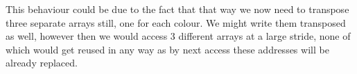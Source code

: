 This behaviour could be due to the fact that that way we now need to transpose three separate arrays still, one for each colour. We might write them transposed as well, however then we would access 3 different arrays at a large stride, none of which would get reused in any way as by next access these addresses will be already replaced.

%
%
%
%

